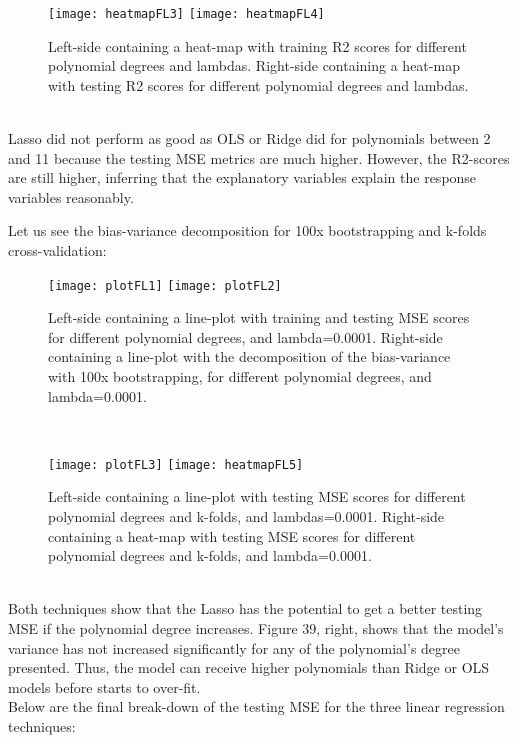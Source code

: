 \begin{figure}[H]
\label{fig:heatmapFL3and4}
\centering
\texttt{[image: heatmapFL3]}
\texttt{[image: heatmapFL4]}
\caption{Left-side containing a heat-map with training R2 scores for different polynomial degrees and lambdas. Right-side containing a heat-map with testing R2 scores for different polynomial degrees and lambdas.}
\end{figure}\\

Lasso did not perform as good as OLS or Ridge did for polynomials between 2 and 11 because the testing MSE metrics are much higher. However, the R2-scores are still higher, inferring that the explanatory variables explain the response variables reasonably.

Let us see the bias-variance decomposition for 100x bootstrapping and k-folds cross-validation: \\

\begin{figure}[H]
\label{fig:plotFL1and2}
\centering
\texttt{[image: plotFL1]}
\texttt{[image: plotFL2]}
\caption{Left-side containing a line-plot with training and testing MSE scores for different polynomial degrees, and lambda=0.0001. Right-side containing a line-plot with the decomposition of the bias-variance with 100x bootstrapping, for different polynomial degrees, and lambda=0.0001.}
\end{figure}\\

\begin{figure}[H]
\label{fig:plotFL3andH5}
\centering
\texttt{[image: plotFL3]}
\texttt{[image: heatmapFL5]}
\caption{Left-side containing a line-plot with testing MSE scores for different polynomial degrees and k-folds, and lambdas=0.0001. Right-side containing a heat-map with testing MSE scores for different polynomial degrees and k-folds, and lambda=0.0001.}
\end{figure}\\

Both techniques show that the Lasso has the potential to get a better testing MSE if the polynomial degree increases. Figure 39, right, shows that the model's variance has not increased significantly for any of the polynomial's degree presented. Thus, the model can receive higher polynomials than Ridge or OLS models before starts to over-fit. \\

Below are the final break-down of the testing MSE for the three linear regression techniques: \\
